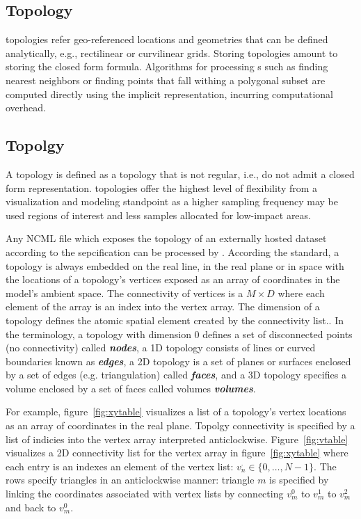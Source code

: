 \subsection{\cgrid{} Topology}
\cgrid{} topologies refer geo-referenced locations and
geometries that can be defined analytically, e.g., rectilinear or
curvilinear grids. Storing \cgrid{} topologies amount to storing the
closed form formula. Algorithms for processing \cgrid{}s such as
finding nearest neighbors or finding points that fall withing a
polygonal subset are computed directly using the implicit \cgrid{}
representation, incurring computational overhead.

\subsection{\ugrid{} Topolgy}
A \ugrid{} topology is  defined as a topology that is not regular, i.e.,
do not admit a closed form representation. \ugrid{} topologies offer
the highest level of flexibility from a visualization and modeling
standpoint as a higher sampling frequency may be used regions of
interest and less samples allocated for low-impact areas. 

Any NCML file which exposes the topology of an externally hosted
dataset according to the \cfugrid{} sepcification can be processed by
\sciwms{}. According the \cfugrid{} standard, a topology is always
embedded on the real line, in the real plane or in space with the
locations of a \ugrid{} topology's vertices exposed as an array of
coordinates in the model's ambient space. The connectivity of vertices
is a $M \times D$ where each element of the array is an index into the
vertex array. The dimension of a topology defines the atomic spatial
element created by the connectivity list.. In the \cfugrid{}
terminology, a topology with dimension 0 defines a set of disconnected
points (no connectivity) called \textbf{\textit{nodes}}, a 1D topology
consists of lines or curved boundaries known as
\textbf{\textit{edges}}, a 2D topology is a set of planes or surfaces
enclosed by a set of edges (e.g. triangulation) called
\textbf{\textit{faces}}, and a 3D topology specifies a volume enclosed
by a set of faces called volumes \textbf{\textit{volumes}}.

For example, figure~\ref{fig:xytable} visualizes a list of a topology's
vertex locations as an array of coordinates in the real plane. Topolgy
connectivity is specified by a list of indicies into the vertex array
interpreted anticlockwise. Figure~\ref{fig:vtable} visualizes a 2D
connectivity list for the vertex array in figure~\ref{fig:xytable}
where each entry is an indexes an element of the vertex list:
$v_n^{\cdot}\in \{0,\ldots,N-1\}$. The rows specify triangles in an
anticlockwise manner: triangle $m$ is specified by linking the
coordinates associated with vertex lists by connecting $v^0_m$ to
$v^1_m$ to $v^2_m$ and back to $v^0_m$.

